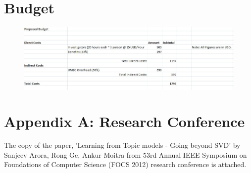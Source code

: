 \documentclass[a4paper,11pt]{article}
\begin{document}
\pagebreak

\section{Budget}
\begin{figure}[h]
\includegraphics[scale=0.7]{Budget.jpg}
\end{figure}



\section{Appendix A: Research Conference}
The copy of the paper, 'Learning from Topic models - Going beyond SVD' by Sanjeev Arora, Rong Ge, Ankur Moitra from 53rd Annual IEEE Symposium on Foundations of Computer Science (FOCS 2012) research conference is attached.
\end{document}
